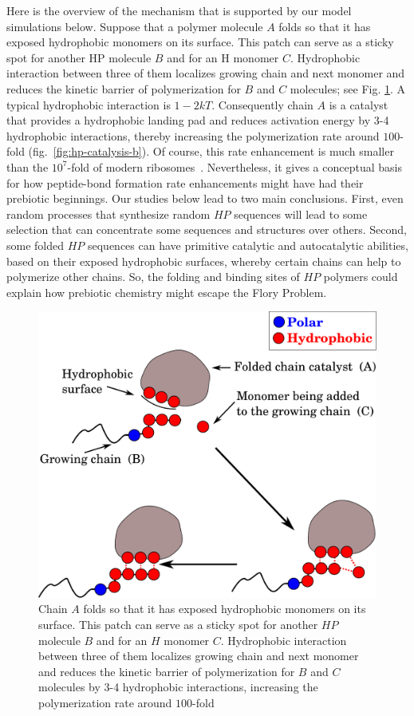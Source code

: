 \documentclass[journal=jacsat,manuscript=article,layout=twocolumn]{achemso}
\begin{document}
   Here is the overview of the mechanism that is supported by our model simulations below.  
   Suppose that a polymer molecule $A$ folds so that it has exposed hydrophobic monomers on its 
surface.  This patch can serve as a sticky spot for another HP molecule $B$ and for an H monomer 
$C$.  Hydrophobic interaction between three of them localizes growing chain and next monomer and 
reduces the kinetic barrier of polymerization for $B$ and $C$ molecules; see Fig. 
\ref{fig:hp-catalysis}.  A typical hydrophobic interaction is $1-2kT$.  Consequently chain $A$ is a 
catalyst that provides a hydrophobic landing pad and reduces activation energy by 3-4 hydrophobic 
interactions, thereby increasing the polymerization rate around $ 100$-fold 
(fig.~\ref{fig:hp-catalysis-b}).  Of course, this rate enhancement is much smaller than the 
$10^7$-fold of modern ribosomes~\cite{Sievers2004a}. Nevertheless, it gives a conceptual basis for 
how peptide-bond formation rate enhancements might have had their prebiotic beginnings.  Our 
studies 
below lead to two main conclusions.  First, even random processes that synthesize random $HP$ 
sequences will lead to some selection that can concentrate some sequences and structures over 
others.  Second, some folded $HP$ sequences can have primitive catalytic and autocatalytic 
abilities, based on their exposed hydrophobic surfaces, whereby certain chains can help to 
polymerize other chains.  So, the folding and binding sites of $HP$ polymers could explain how 
prebiotic chemistry might escape the Flory Problem.
   
   \begin{figure}[h!]
  \centering
  \includegraphics[width=0.9\columnwidth]{pictures/hp-catalysis.pdf} 
  \caption{\footnotesize{Chain $A$ folds so that it has exposed hydrophobic monomers on its surface.
 This patch can serve as a sticky spot for another $HP$ molecule $B$ and for an $H$ monomer $C$.  
Hydrophobic interaction between three of them localizes growing chain and next monomer and reduces 
the kinetic barrier of polymerization for $B$ and $C$ molecules by 3-4 hydrophobic interactions, 
increasing the polymerization rate around $100$-fold }}
  \label{fig:hp-catalysis}
\end{figure} 
\end{document}
